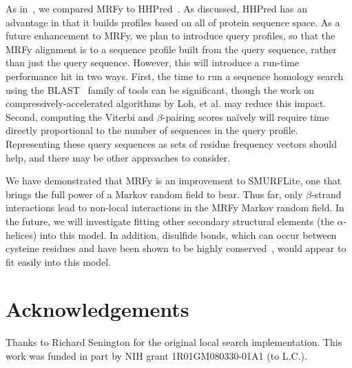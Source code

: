 \documentclass{acm_proc_article-sp}
\begin{document}
As in~\cite{Daniels:2012dg}, we compared MRFy to 
HHPred~\cite{Soding:2005ff}.
As discussed, HHPred has an advantage in that it builds profiles based on all
of protein sequence space.
As a future enhancement to MRFy, we plan to introduce query profiles, so that
the MRFy alignment is to a sequence profile built from the query sequence,
rather than just the query sequence.
However, this will introduce a run-time performance hit in two ways.
First, the time to run a sequence homology search using the BLAST~\cite{Altschul:1997tl} 
family of tools can be significant, though the work on 
compressively-accelerated algorithms by Loh, et al.\cite{Loh:2012br} may reduce this 
impact.
Second, computing the Viterbi and $\beta$-pairing scores na\"{i}vely will
require time directly proportional to the number of sequences in the query
profile.
Representing these query sequences as sets of residue frequency vectors should
help, and there may be other approaches to consider.

We have demonstrated that MRFy is an improvement to SMURFLite, one that brings
the full power of a Markov random field to bear.
Thus far, only $\beta$-strand interactions lead to non-local interactions in the
MRFy Markov random field.
In the future, we will investigate fitting other secondary structural elements
(the $\alpha$-helices) into this model.
In addition, disulfide bonds, which can occur between cysteine residues and
have been shown to be highly conserved~\cite{Naamati:2009eg, Tirosh:2012iq}, 
would appear to fit easily into this model.

\section{Acknowledgements}
Thanks to Richard Senington for the original local search implementation. 
This work was funded in part by NIH grant 1R01GM080330-01A1 (to L.C.).



{\small 

  }
\end{document}
